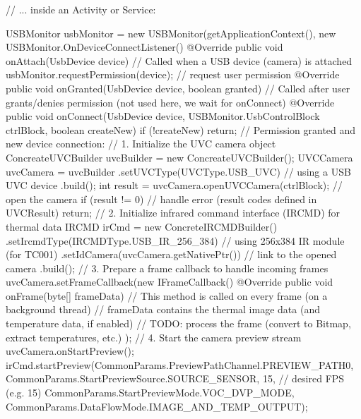 {    // ... inside an Activity or Service:

    USBMonitor usbMonitor = new USBMonitor(getApplicationContext(), new USBMonitor.OnDeviceConnectListener() {
        @Override 
        public void onAttach(UsbDevice device) {
            // Called when a USB device (camera) is attached
            usbMonitor.requestPermission(device);  // request user permission
        }
        @Override 
        public void onGranted(UsbDevice device, boolean granted) {
            // Called after user grants/denies permission (not used here, we wait for onConnect)
        }
        @Override 
        public void onConnect(UsbDevice device, USBMonitor.UsbControlBlock ctrlBlock, boolean createNew) {
            if (!createNew) return;
            // Permission granted and new device connection:
            // 1. Initialize the UVC camera object
            ConcreateUVCBuilder uvcBuilder = new ConcreateUVCBuilder();
            UVCCamera uvcCamera = uvcBuilder
                    .setUVCType(UVCType.USB_UVC)      // using a USB UVC device
                    .build();
            int result = uvcCamera.openUVCCamera(ctrlBlock);  // open the camera
            if (result != 0) {
                // handle error (result codes defined in UVCResult)
                return;
            }
            // 2. Initialize infrared command interface (IRCMD) for thermal data
            IRCMD irCmd = new ConcreteIRCMDBuilder()
                    .setIrcmdType(IRCMDType.USB_IR_256_384)   // using 256x384 IR module (for TC001)
                    .setIdCamera(uvcCamera.getNativePtr())   // link to the opened camera
                    .build();
            // 3. Prepare a frame callback to handle incoming frames
            uvcCamera.setFrameCallback(new IFrameCallback() {
                @Override
                public void onFrame(byte[] frameData) {
                    // This method is called on every frame (on a background thread)
                    // frameData contains the thermal image data (and temperature data, if enabled)
                    // TODO: process the frame (convert to Bitmap, extract temperatures, etc.)
                }
            });
            // 4. Start the camera preview stream
            uvcCamera.onStartPreview();
            irCmd.startPreview(CommonParams.PreviewPathChannel.PREVIEW_PATH0,
                               CommonParams.StartPreviewSource.SOURCE_SENSOR,
                               15,  // desired FPS (e.g. 15)
                               CommonParams.StartPreviewMode.VOC_DVP_MODE,
                               CommonParams.DataFlowMode.IMAGE_AND_TEMP_OUTPUT);
}}}
